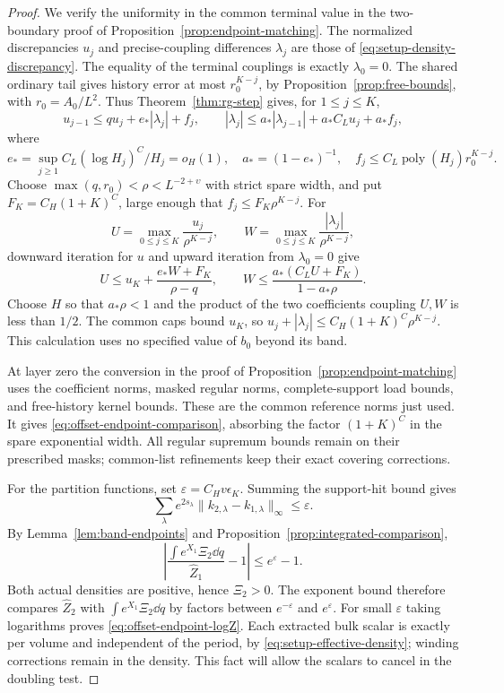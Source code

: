 \begin{proof}
We verify the uniformity in the common terminal value in the
two-boundary proof of Proposition~\ref{prop:endpoint-matching}.
The normalized discrepancies $u_j$ and precise-coupling differences
$\lambda_j$ are those of \eqref{eq:setup-density-discrepancy}.
The equality of the terminal couplings is exactly $\lambda_0=0$.
The shared ordinary tail gives history error at most
$r_0^{K-j}$, by Proposition~\ref{prop:free-bounds}, with
$r_0=A_0/L^2$.  Thus Theorem~\ref{thm:rg-step} gives, for
$1\le j\le K$,
\[
 u_{j-1}\le q u_j+e_*|\lambda_j|+f_j,
 \qquad
 |\lambda_j|\le a_*|\lambda_{j-1}|+a_*C_Lu_j+a_*f_j,
\]
where
\[
 e_* = \sup_{j\ge1}C_L(\log H_j)^C/H_j=o_H(1),
 \quad a_*=(1-e_*)^{-1},\quad
 f_j\le C_L\operatorname{poly}(H_j)r_0^{K-j}.
\]
Choose $\max(q,r_0)<\rho<L^{-2+\upsilon}$ with strict spare width,
and put $F_K=C_H(1+K)^C$, large enough that
$f_j\le F_K\rho^{K-j}$.  For
\[
 U=\max_{0\le j\le K}\frac{u_j}{\rho^{K-j}},
 \qquad W=\max_{0\le j\le K}
                  \frac{|\lambda_j|}{\rho^{K-j}},
\]
downward iteration for $u$ and upward iteration from $\lambda_0=0$
give
\[
 U\le u_K+\frac{e_*W+F_K}{\rho-q},
 \qquad
 W\le\frac{a_*(C_LU+F_K)}{1-a_*\rho}.
\]
Choose $H$ so that $a_*\rho<1$ and the product of the two
coefficients coupling $U,W$ is less than $1/2$.
The common caps bound $u_K$, so
$u_j+|\lambda_j|\le C_H(1+K)^C\rho^{K-j}$.
This calculation uses no specified value of $b_0$ beyond its band.

At layer zero the conversion in the proof of
Proposition~\ref{prop:endpoint-matching} uses the coefficient norms,
masked regular norms, complete-support load bounds, and free-history
kernel bounds.  These are the common reference norms just used.
It gives \eqref{eq:offset-endpoint-comparison}, absorbing the factor
$(1+K)^C$ in the spare exponential width.  All regular supremum bounds
remain on their prescribed masks; common-list refinements keep their
exact covering corrections.

For the partition functions, set
$\varepsilon=C_Hv\epsilon_K$.  Summing the support-hit bound gives
\[
 \sum_\lambda e^{2s_\lambda}
       \|k_{2,\lambda}-k_{1,\lambda}\|_\infty\le\varepsilon.
\]
By Lemma~\ref{lem:band-endpoints} and
Proposition~\ref{prop:integrated-comparison},
\[
 \left|
 \frac{\int e^{X_1}\Xi_2\dd q}{\widehat Z_1}-1
 \right|\le e^{\varepsilon}-1.
\]
Both actual densities are positive, hence $\Xi_2>0$.
The exponent bound therefore compares $\widehat Z_2$ with
$\int e^{X_1}\Xi_2\dd q$ by factors between
$e^{-\varepsilon}$ and $e^{\varepsilon}$.  For small $\varepsilon$
taking logarithms proves \eqref{eq:offset-endpoint-logZ}.
Each extracted bulk scalar is exactly per volume and independent of
the period, by \eqref{eq:setup-effective-density}; winding
corrections remain in the density.  This fact will allow the scalars
to cancel in the doubling test.
\end{proof}

